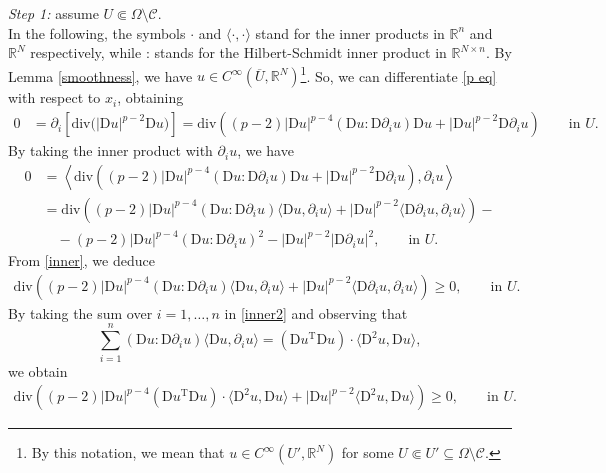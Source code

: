 \documentclass[a4paper,11pt]{article}
\numberwithin{equation}{section}
\newcommand{\numberset}{\mathbb}
\newcommand{\Om}{\Omega}
\newcommand{\R}{\numberset{R}}
\newcommand{\rom}{\mathrm}
\theoremstyle{definition}
\begin{document}
\noindent \textit{Step 1:} assume $U\Subset\Om\setminus\mathscr{C}$.\\
 In the following, the symbols $\cdot$ and $ \langle\cdot,\cdot\rangle$ stand for the inner products in $\R^n$ and $\R^N$ respectively, while : stands for the Hilbert-Schmidt inner product in $\R^{N\times n}$. By Lemma \ref{smoothness}, we have $u\in C^\infty(\overline U,\R^N)$\footnote{By this notation, we mean that $u\in C^\infty(U',\R^N)$ for some $U\Subset U'\subseteq \Om\setminus\mathscr C$.}. So, we can differentiate \eqref{p eq} with respect to $x_i$, obtaining
\begin{align*}
0&=\partial_i\left[\rom{div}\big(|\rom Du|^{{p-2}}\rom Du\big)\right]=\rom{div}\left((p-2)|\rom Du|^{{p-4}}(\rom Du:\rom D\partial_i u)\rom Du+|\rom Du|^{{p-2}}\rom D\partial_iu\right)\qquad\mbox{in }U.
\end{align*}
By taking the inner product with $\partial_i u$, we have
\begin{equation}\label{inner}
\begin{aligned}
0&=\left\langle\rom{div}\left((p-2)|\rom Du|^{p-4}(\rom Du:\rom D\partial_i u)\rom Du+|\rom Du|^{{p-2}}\rom D\partial_i u\right),\partial_i u\right\rangle\\
&=\rom{div}\left((p-2)|\rom Du|^{p-4}(\rom Du:\rom D\partial_i u)\langle\rom Du,\partial_iu\rangle+|\rom Du|^{p-2}\langle\rom D\partial _iu,\partial_iu\rangle\right)-\\
&\quad-(p-2)|\rom Du|^{p-4}(\rom Du:\rom D\partial_i u)^2-|\rom Du|^{p-2}|\rom D\partial_iu|^2, \qquad\mbox{in }U.
\end{aligned}
\end{equation}
From \eqref{inner}, we deduce
\begin{equation}\label{inner2}
\begin{aligned}
\rom{div}\left((p-2)|\rom Du|^{p-4}(\rom Du:\rom D\partial_i u)\langle\rom Du,\partial_iu\rangle+|\rom Du|^{p-2}\langle\rom D\partial _iu,\partial_iu\rangle\right)\geq0, \qquad\mbox{in }U.
\end{aligned}
\end{equation}
By taking the sum over $i=1,\ldots,n$ in \eqref{inner2} and observing that
$$
\sum_{i=1}^n(\rom Du:\rom D\partial_i u)\langle\rom Du,\partial_iu\rangle=\left(\rom Du^\rom T\rom Du\right)\cdot\langle\rom D^2u, \rom Du\rangle,
$$
we obtain
\begin{equation}\label{inner3}
\begin{aligned}
\rom{div}\left((p-2)|\rom Du|^{p-4}\left(\rom Du^\rom T\rom Du\right)\cdot\langle\rom D^2u, \rom Du\rangle+|\rom Du|^{p-2}\langle\rom D^2u,\rom Du\rangle\right)\geq0, \qquad\mbox{in }U.
\end{aligned}
\end{equation}
\end{document}
